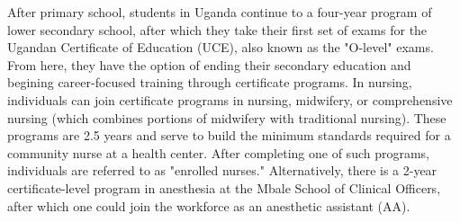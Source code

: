 \documentclass[12pt]{article} %
\begin{document}
After primary school, students in Uganda continue to a four-year program of lower secondary school, after which they take their first set of exams for the Ugandan Certificate of Education (UCE), also known as the "O-level" exams. From here, they have the option of ending their secondary education and begining career-focused training through certificate programs.  
\cite{UNFPA2009}
In nursing, individuals can join certificate programs in nursing, midwifery, or comprehensive nursing (which combines portions of midwifery with traditional nursing). 
These programs are 2.5 years and serve to build the minimum standards required for a community nurse at a health center. After completing one of such programs, individuals are referred to as "enrolled nurses."
\citet{Klopper2012-pp}
Alternatively, there is a 2-year certificate-level program in anesthesia at the Mbale School of Clinical Officers, after which one could join the workforce as an anesthetic assistant (AA). 
\end{document}
